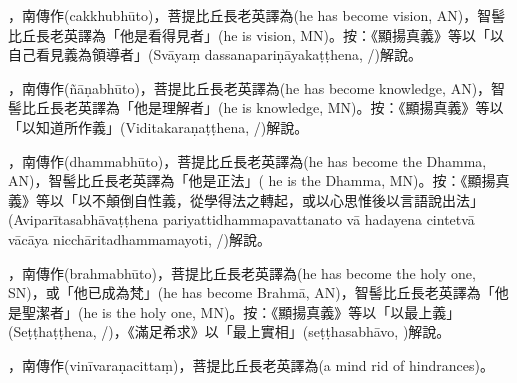 \startitemgroup[noteitems]
\item{}，南傳作(cakkhubhūto)，菩提比丘長老英譯為(he has become vision, AN)，智髻比丘長老英譯為「他是看得見者」(he is vision, MN)。按：《顯揚真義》等以「以自己看見義為領導者」(Svāyaṃ dassanapariṇāyakaṭṭhena, /)解說。
\stopitemgroup

\startitemgroup[noteitems]
\item{}，南傳作(ñāṇabhūto)，菩提比丘長老英譯為(he has become knowledge, AN)，智髻比丘長老英譯為「他是理解者」(he is knowledge, MN)。按：《顯揚真義》等以「以知道所作義」(Viditakaraṇaṭṭhena, /)解說。
\stopitemgroup

\startitemgroup[noteitems]
\item{}，南傳作(dhammabhūto)，菩提比丘長老英譯為(he has become the Dhamma, AN)，智髻比丘長老英譯為「他是正法」( he is the Dhamma, MN)。按：《顯揚真義》等以「以不顛倒自性義，從學得法之轉起，或以心思惟後以言語說出法」(Aviparītasabhāvaṭṭhena pariyattidhammapavattanato vā hadayena cintetvā vācāya nicchāritadhammamayoti, /)解說。
\stopitemgroup

\startitemgroup[noteitems]
\item{}，南傳作(brahmabhūto)，菩提比丘長老英譯為(he has become the holy one, SN)，或「他已成為梵」(he has become Brahmā, AN)，智髻比丘長老英譯為「他是聖潔者」(he is the holy one, MN)。按：《顯揚真義》等以「以最上義」(Seṭṭhaṭṭhena, /)，《滿足希求》以「最上實相」(seṭṭhasabhāvo, )解說。
\stopitemgroup

\startitemgroup[noteitems]
\item{}，南傳作(vinīvaraṇacittaṃ)，菩提比丘長老英譯為(a mind rid of hindrances)。
\stopitemgroup


